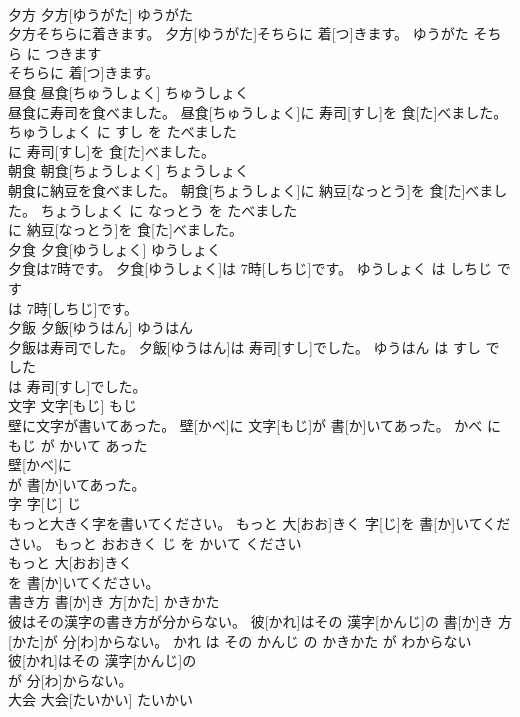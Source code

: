 \documentclass[8pt]{extreport}
\begin{document}
\begin{CJK}{UTF8}{min}
\\	夕方	夕方[ゆうがた]	ゆうがた	
\\	夕方そちらに着きます。	夕方[ゆうがた]そちらに 着[つ]きます。	ゆうがた そちら に つきます	
\\	そちらに 着[つ]きます。			
\\	昼食	昼食[ちゅうしょく]	ちゅうしょく	
\\	昼食に寿司を食べました。	昼食[ちゅうしょく]に 寿司[すし]を 食[た]べました。	ちゅうしょく に すし を たべました	
\\	に 寿司[すし]を 食[た]べました。			
\\	朝食	朝食[ちょうしょく]	ちょうしょく	
\\	朝食に納豆を食べました。	朝食[ちょうしょく]に 納豆[なっとう]を 食[た]べました。	ちょうしょく に なっとう を たべました	
\\	に 納豆[なっとう]を 食[た]べました。			
\\	夕食	夕食[ゆうしょく]	ゆうしょく	
\\	夕食は7時です。	夕食[ゆうしょく]は 7時[しちじ]です。	ゆうしょく は しちじ です	
\\	は 7時[しちじ]です。			
\\	夕飯	夕飯[ゆうはん]	ゆうはん	
\\	夕飯は寿司でした。	夕飯[ゆうはん]は 寿司[すし]でした。	ゆうはん は すし でした	
\\	は 寿司[すし]でした。			
\\	文字	文字[もじ]	もじ	
\\	壁に文字が書いてあった。	壁[かべ]に 文字[もじ]が 書[か]いてあった。	かべ に もじ が かいて あった	
\\	壁[かべ]に
\\	が 書[か]いてあった。			
\\	字	字[じ]	じ	
\\	もっと大きく字を書いてください。	もっと 大[おお]きく 字[じ]を 書[か]いてください。	もっと おおきく じ を かいて ください	
\\	もっと 大[おお]きく
\\	を 書[か]いてください。			
\\	書き方	書[か]き 方[かた]	かきかた	
\\	彼はその漢字の書き方が分からない。	彼[かれ]はその 漢字[かんじ]の 書[か]き 方[かた]が 分[わ]からない。	かれ は その かんじ の かきかた が わからない	
\\	彼[かれ]はその 漢字[かんじ]の
\\	が 分[わ]からない。			
\\	大会	大会[たいかい]	たいかい	

\end{CJK}
\end{document}
